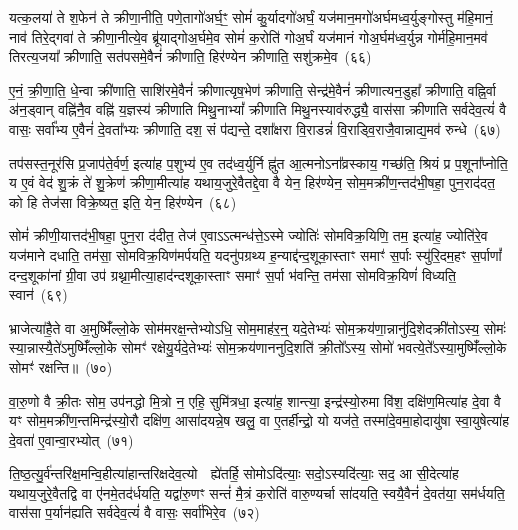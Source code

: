 {\anuvakamend[{इत॑रं पशु॒मान्थ्स्या᳚द्या॒त्यन॑सो॒थ्सर्ग॑न्तू॒ष्णीꣳ स॑र्वदेव॒त्यं॑ वै त्रय॑स्त्रिꣳशच्च}]}%

यत्क॒लया॑ ते श॒फेन॑ ते क्रीणा॒नीति॒ पणे॒तागो॑अर्घ॒ꣳ॒ सोमं॑ कु॒र्यादगो॑अर्घं॒ यज॑मान॒मगो॑अर्घमध्व॒र्युङ्गोस्तु म॑हि॒मानं॒ नाव॑ तिरे॒द्गवा॑ ते क्रीणा॒नीत्ये॒व ब्रू॑याद्गोअ॒र्घमे॒व सोमं॑ क॒रोति॑ गोअ॒र्घं यज॑मानं गोअ॒र्घम॑ध्व॒र्युन्न गोर्म॑हि॒मान॒मव॑ तिरत्य॒जया᳚ क्रीणाति॒ सत॑पसमे॒वैनं॑ क्रीणाति॒ हिर॑ण्येन क्रीणाति॒ सशु॑क्रमे॒व~(६६)

ए॒नं॒ क्री॒णा॒ति॒ धे॒न्वा क्री॑णाति॒ साशि॑रमे॒वैनं॑ क्रीणात्यृष॒भेण॑ क्रीणाति॒ सेन्द्र॑मे॒वैनं॑ क्रीणात्यन॒डुहा᳚ क्रीणाति॒ वह्नि॒र्वा अ॑न॒ड्वान् वह्नि॑नै॒व वह्नि॑ य॒ज्ञस्य॑ क्रीणाति मिथु॒ना\-भ्यां᳚ क्रीणाति मिथु॒नस्याव॑रुद्ध्यै॒ वास॑सा क्रीणाति सर्वदेव॒त्यं॑ वै वासः॒ सर्वा᳚भ्य ए॒वैनं॑ दे॒वता᳚भ्यः क्रीणाति॒ दश॒ सं प॑द्यन्ते॒ दशा᳚क्षरा वि॒राडन्नं॑ वि॒राड्वि॒राजै॒वान्नाद्य॒मव॑ रुन्धे~(६७)

तप॑सस्त॒नूर॑सि प्र॒जा\-प॑ते॒र्वर्ण॒ इत्या॑ह प॒शुभ्य॑ ए॒व तद॑ध्व॒र्युर्नि ह्नु॑त आ॒त्मनो\-ऽना᳚व्रस्काय॒ गच्छ॑ति॒ श्रियं प्र प॒शूना᳚प्नोति॒ य ए॒वं वेद॑ शु॒क्रं ते॑ शु॒क्रेण॑ क्रीणा॒मीत्या॑ह यथाय॒जुरे॒वैतद्दे॒वा वै येन॒ हिर॑ण्येन॒ सोम॒मक्री॑ण॒न्तद॑भी॒षहा॒ पुन॒राद॑दत॒ को हि तेज॑सा विक्रे॒ष्यत॒ इति॒ येन॒ हिर॑ण्येन~(६८)

सोमं॑ क्रीणी॒यात्तद॑भी॒षहा॒ पुन॒रा द॑दीत॒ तेज॑ ए॒वा\-ऽऽ\-त्मन्ध॑त्ते॒\-ऽस्मे ज्योतिः॑ सोमविक्र॒यिणि॒ तम॒ इत्या॑ह॒ ज्योति॑रे॒व यज॑माने दधाति॒ तम॑सा॒ सोमविक्र॒यिण॑मर्पयति॒ यदनु॑पग्रथ्य ह॒न्याद्द॑न्द॒शूका॒स्ताꣳ समाꣳ॑ स॒र्पाः स्यु॑रि॒दम॒हꣳ स॒र्पाणां᳚ दन्द॒शूका॑नां ग्री॒वा उप॑ ग्रथ्ना॒मीत्या॒हाद॑न्दशूका॒स्ताꣳ समाꣳ॑ स॒र्पा भ॑वन्ति॒ तम॑सा सोमविक्र॒यिणं॑ विध्यति॒ स्वान॑~(६९)

भ्राजेत्या॑है॒ते वा अ॒मुष्मिँ॑ल्लो॒के सोम॑मरक्ष॒न्तेभ्यो\-ऽधि॒ सोम॒माह॑र॒न्॒ यदे॒तेभ्यः॑ सोम॒क्रय॑णा॒न्नानु॑दि॒शेदक्री॑तो\-ऽस्य॒ सोमः॑ स्या॒न्नास्यै॒ते॑\-ऽमुष्मिँ॑ल्लो॒के सोमꣳ॑ रक्षेयु॒र्यदे॒तेभ्यः॑ सोम॒क्रय॑णाननुदि॒शति॑ क्री॒तो᳚\-ऽस्य॒ सोमो॑ भवत्ये॒ते᳚\-ऽस्या॒मुष्मिँ॑ल्लो॒के सोमꣳ॑ रक्षन्ति॥~(७०)

{\anuvakamend[{सशु॑क्रमे॒व रु॑न्ध॒ इति॒ येन॒ हिर॑ण्येन॒ स्वान॒ चतु॑श्चत्वारिꣳशच्च}]}%

वा॒रु॒णो वै क्री॒तः सोम॒ उप॑नद्धो मि॒त्रो न॒ एहि॒ सुमि॑त्रधा॒ इत्या॑ह॒ शान्त्या॒ इन्द्र॑स्यो॒रुमा वि॑श॒ दक्षि॑ण॒मित्या॑ह दे॒वा वै यꣳ सोम॒मक्री॑ण॒न्तमिन्द्र॑स्यो॒रौ दक्षि॑ण॒ आसा॑दयन्ने॒ष खलु॒ वा ए॒तर्\mbox{}हीन्द्रो॒ यो यज॑ते॒ तस्मा॑दे॒वमा॒होदायु॑षा स्वा॒युषेत्या॑ह दे॒वता॑ ए॒वान्वा॒रभ्योत्~(७१)

ति॒ष्ठ॒त्यु॒र्व॑न्तरि॑क्ष॒मन्वि॒हीत्या॑हान्तरिक्षदेव॒त्यो  ह्ये॑तर्\mbox{}हि॒ सोमो\-ऽदि॑त्याः॒ सदो॒\-ऽस्यदि॑त्याः॒ सद॒ आ सी॒देत्या॑ह यथाय॒जुरे॒वैतद्वि वा ए॑नमे॒तद॑र्धयति॒ यद्वा॑रु॒णꣳ सन्तं॑ मै॒त्रं क॒रोति॑ वारु॒ण्यर्चा सा॑दयति॒ स्वयै॒वैनं॑ दे॒वत॑या॒ सम॑र्धयति॒ वास॑सा प॒र्यान॑ह्यति सर्वदेव॒त्यं॑ वै वासः॒ सर्वा॑भिरे॒व~(७२)

